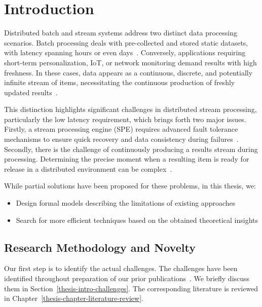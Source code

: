 \chapter{Introduction}

Distributed batch and stream systems address two distinct data processing scenarios. Batch processing deals with pre-collected and stored static datasets, with latency spanning hours or even days~\cite{carbone2015apache, chang2014hawq, sun2023survey}. Conversely, applications requiring short-term personalization, IoT, or network monitoring demand results with high freshness. In these cases, data appears as a continuous, discrete, and potentially infinite stream of items, necessitating the continuous production of freshly updated results~\cite{fragkoulis2024survey, diro2024anomaly}.

This distinction highlights significant challenges in distributed stream processing, particularly the low latency requirement, which brings forth two major issues. Firstly, a stream processing engine (SPE) requires advanced fault tolerance mechanisms to ensure quick recovery and data consistency during failures~\cite{Wang:2019:LSF:3341301.3359653, akidau2015streaming}. Secondly, there is the challenge of continuously producing a results stream during processing. Determining the precise moment when a resulting item is ready for release in a distributed environment can be complex~\cite{Tucker:2003:EPS:776752.776780, DBLP:journals/pvldb/BegoliACHKKMS21}.

While partial solutions have been proposed for these problems, in this thesis, we: 
\begin{itemize}
    \item Design formal models describing the limitations of existing approaches
    \item Search for more efficient techniques based on the obtained theoretical insights
\end{itemize}

\section{Research Methodology and Novelty}

Our first step is to identify the actual challenges. The challenges have been identified throughout preparation of our prior publications~\cite{we2018adbis, trofimov2018consistency, we2018seim, we2018beyondmr, we2019debs, webirte, thepaper, 10.1145/3524860.3539809, trofimov2023bounding}. We briefly discuss them in Section~\ref{thesis-intro-challenges}. The corresponding literature is reviewed in Chapter~\ref{thesis-chapter-literature-review}.

